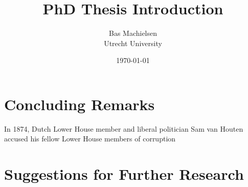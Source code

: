 

\title{\textbf{PhD Thesis Introduction}}
\author{Bas Machielsen \\ Utrecht University}
\date{\today}



\maketitle

\section{Concluding Remarks}

In 1874, Dutch Lower House member and liberal politician Sam van Houten accused his fellow Lower House members of corruption 


\section{Suggestions for Further Research}


